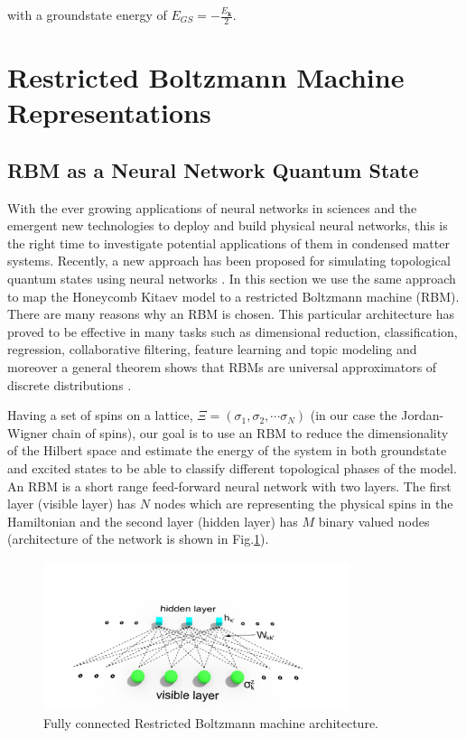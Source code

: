 \documentclass{article}
\begin{document}
\noindent with a groundstate energy of $E_{GS} = -\frac{E_\textbf{k}}{2}$.

\section{Restricted Boltzmann Machine Representations}\label{sec3}

\subsection{RBM as a Neural Network Quantum State}

With the ever growing applications of neural networks in sciences and the emergent new technologies to deploy and build physical neural networks, this is the right time to investigate potential applications of them in condensed matter systems. Recently, a new approach has been proposed for simulating topological quantum states using neural networks \cite{Deng_2017}. In this section we use the same approach to map the Honeycomb Kitaev model to a restricted Boltzmann machine (RBM). There are many reasons why an RBM is chosen. This particular architecture has proved to be effective in many tasks such as dimensional reduction, classification, regression, collaborative filtering, feature learning and topic modeling and moreover a general theorem shows that RBMs are universal approximators of discrete distributions \cite{LeRouxBengio}.

Having a set of spins on a lattice, $\Xi=(\sigma_{1},\sigma_{2},\cdots\sigma_{N})$ (in our case the Jordan-Wigner chain of spins), our goal is to use an RBM to reduce the dimensionality of the Hilbert space and estimate the energy of the system in both groundstate and excited states to be able to classify different topological phases of the model. An RBM is a short range feed-forward neural network with two layers. The first layer (visible layer) has $N$ nodes which are representing the physical spins in the Hamiltonian and the second layer (hidden layer) has $M$ binary valued nodes (architecture of the network is shown in Fig.\ref{rbm-arc}). 

\begin{figure}[!htb]
	\centering
	\includegraphics[width=0.8\textwidth]{./images/rbm}
	\caption{\label{rbm-arc} Fully connected Restricted Boltzmann machine architecture.}
\end{figure}
\end{document}
